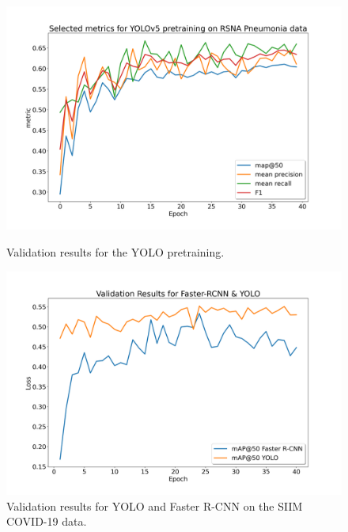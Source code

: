\begin{figure}
	\begin{minipage}[b]{.5\linewidth} %
		\includegraphics[width=\linewidth]{img/metrics_giou_pretrained_yolo_40.png}
		\caption{Validation results for the \ac{YOLO} pretraining.}
		\label{fig:yolo_pretraining_results}
	\end{minipage}
	\begin{minipage}[b]{.5\linewidth} %
		\includegraphics[width=\linewidth]{img/eval_results_ap_only_fasterrcnn_yolo.png}
		\caption{Validation results for \ac{YOLO} and Faster \ac{R-CNN} on the SIIM COVID-19 data.}
		\label{fig:yolo_frcnn_results}
	\end{minipage}
\end{figure}


